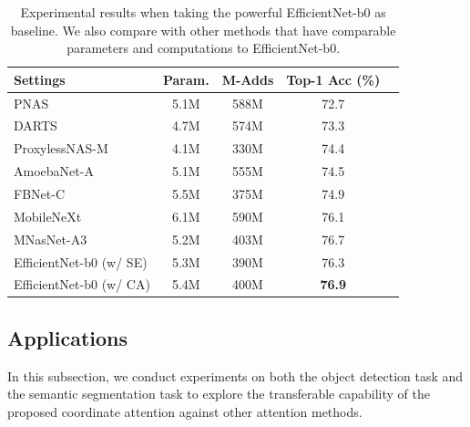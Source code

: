 \documentclass[final]{cvpr}
\begin{document}
\begin{table}[t]
    \centering
    \small
    \setlength\tabcolsep{1mm}
    \renewcommand{\arraystretch}{1.1}
    \caption{Experimental results when taking the powerful
    EfficientNet-b0 \cite{tan2019efficientnet} as baseline.
    We also compare with other methods that
    have comparable parameters and computations
    to EfficientNet-b0.}
    \begin{tabular}{lcccc} \midrule[1pt]
    Settings & Param. & M-Adds & Top-1 Acc (\%)  \\ \midrule[1pt]
    PNAS \cite{liu2018progressive} & 5.1M & 588M & 72.7 \\
    DARTS \cite{liu2018darts} & 4.7M & 574M & 73.3 \\
    ProxylessNAS-M \cite{cai2018proxylessnas} & 4.1M & 330M & 74.4 \\
    AmoebaNet-A \cite{real2019regularized} & 5.1M & 555M & 74.5 \\
    FBNet-C \cite{wu2019fbnet}  & 5.5M & 375M & 74.9 \\
    MobileNeXt \cite{daquan2020rethinking} & 6.1M & 590M & 76.1 \\
    MNasNet-A3 \cite{tan2019mnasnet} & 5.2M & 403M & 76.7 \\ \midrule[1pt]
    EfficientNet-b0 (w/ SE) \cite{tan2019efficientnet} & 5.3M & 390M & 76.3     \\
    EfficientNet-b0 (w/ CA) &  5.4M & 400M & \textbf{76.9} \\
    \bottomrule[1pt]
    \end{tabular}
    \label{tab:efficientnet}
\end{table}

\subsection{Applications}

In this subsection, we conduct experiments
on both the object detection task and
the semantic segmentation task to explore the transferable capability of the proposed 
coordinate attention against other attention methods.
\end{document}

